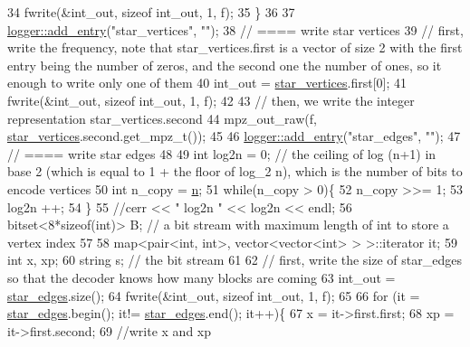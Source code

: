 \begin{DoxyCode}
34     fwrite(&int\_out, \textcolor{keyword}{sizeof} int\_out, 1, f);
35   \}
36 
37   \hyperlink{classlogger_a710163deb17bc81f70d53d285b8ac9ac}{logger::add\_entry}(\textcolor{stringliteral}{"star\_vertices"}, \textcolor{stringliteral}{""});
38   \textcolor{comment}{// ==== write star vertices}
39   \textcolor{comment}{// first, write the frequency, note that star\_vertices.first is a vector of size 2 with the first entry
       being the number of zeros, and the second one the number of ones, so it enough to write only one of them}
40   int\_out = \hyperlink{classmarked__graph__compressed_a7a4ced4586e2e353f9076bd447df5208}{star\_vertices}.first[0];
41   fwrite(&int\_out, \textcolor{keyword}{sizeof} int\_out, 1, f);
42 
43   \textcolor{comment}{// then, we write the integer representation star\_vertices.second}
44   mpz\_out\_raw(f, \hyperlink{classmarked__graph__compressed_a7a4ced4586e2e353f9076bd447df5208}{star\_vertices}.second.get\_mpz\_t());
45 
46   \hyperlink{classlogger_a710163deb17bc81f70d53d285b8ac9ac}{logger::add\_entry}(\textcolor{stringliteral}{"star\_edges"}, \textcolor{stringliteral}{""});
47   \textcolor{comment}{// ==== write star edges}
48 
49   \textcolor{keywordtype}{int} log2n = 0; \textcolor{comment}{// the ceiling of log (n+1) in base 2 (which is equal to 1 + the floor of log\_2 n), which
       is the number of bits to encode vertices}
50   \textcolor{keywordtype}{int} n\_copy = \hyperlink{classmarked__graph__compressed_a8d841016ddb11cfd33748c8deb6277ba}{n};
51   \textcolor{keywordflow}{while}(n\_copy > 0)\{
52     n\_copy >>= 1;
53     log2n ++;
54   \}
55   \textcolor{comment}{//cerr << " log2n " << log2n << endl;}
56   bitset<8*sizeof(int)> B; \textcolor{comment}{// a bit stream with maximum length of int to store a vertex index}
57 
58   map<pair<int, int>, vector<vector<int> > >::iterator it;
59   \textcolor{keywordtype}{int} x, xp;
60   \textcolor{keywordtype}{string} s; \textcolor{comment}{// the bit stream}
61 
62   \textcolor{comment}{// first, write the size of star\_edges so that the decoder knows how many blocks are coming}
63   int\_out = \hyperlink{classmarked__graph__compressed_a7df5779d313486644132bd816937f532}{star\_edges}.size();
64   fwrite(&int\_out, \textcolor{keyword}{sizeof} int\_out, 1, f);
65 
66   \textcolor{keywordflow}{for} (it = \hyperlink{classmarked__graph__compressed_a7df5779d313486644132bd816937f532}{star\_edges}.begin(); it!= \hyperlink{classmarked__graph__compressed_a7df5779d313486644132bd816937f532}{star\_edges}.end(); it++)\{
67     x = it->first.first;
68     xp = it->first.second;
69     \textcolor{comment}{//write x and xp}

\end{DoxyCode}
